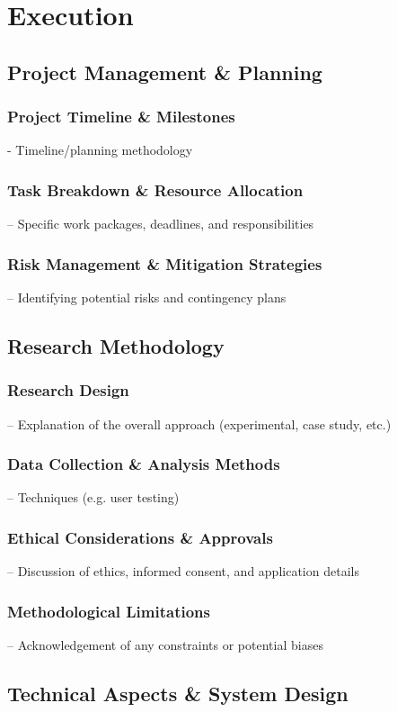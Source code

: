 \section{Execution}

\subsection{Project Management \& Planning}
\subsubsection{Project Timeline \& Milestones}
- Timeline/planning methodology
\subsubsection{Task Breakdown \& Resource Allocation}
– Specific work packages, deadlines, and responsibilities
\subsubsection{Risk Management \& Mitigation Strategies}
– Identifying potential risks and contingency plans
\subsection{Research Methodology}
\subsubsection{Research Design}
– Explanation of the overall approach (experimental, case study, etc.)
\subsubsection{Data Collection \& Analysis Methods}
– Techniques (e.g. user testing)
\subsubsection{Ethical Considerations \& Approvals}
– Discussion of ethics, informed consent, and application details
\subsubsection{Methodological Limitations}
– Acknowledgement of any constraints or potential biases
\subsection{Technical Aspects \& System Design}
